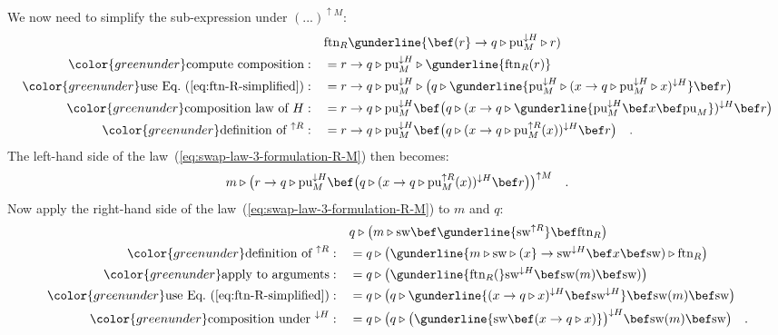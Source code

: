 We now need to simplify the sub-expression under $(...)^{\uparrow M}$:
\begin{align*}
 & \text{ftn}_{R}\gunderline{\bef(r}\rightarrow q\triangleright\text{pu}_{M}^{\downarrow H}\triangleright r)\\
{\color{greenunder}\text{compute composition}:}\quad & =r\rightarrow q\triangleright\text{pu}_{M}^{\downarrow H}\triangleright\gunderline{\text{ftn}_{R}(r)}\\
{\color{greenunder}\text{use Eq.~(\ref{eq:ftn-R-simplified})}:}\quad & =r\rightarrow q\triangleright\text{pu}_{M}^{\downarrow H}\triangleright\big(q\triangleright\gunderline{\text{pu}_{M}^{\downarrow H}\triangleright(x\rightarrow q\triangleright\text{pu}_{M}^{\downarrow H}\triangleright x)^{\downarrow H}}\bef r\big)\\
{\color{greenunder}\text{composition law of }H:}\quad & =r\rightarrow q\triangleright\text{pu}_{M}^{\downarrow H}\bef\big(q\triangleright(x\rightarrow q\triangleright\gunderline{\text{pu}_{M}^{\downarrow H}\bef x\bef\text{pu}_{M}})^{\downarrow H}\bef r\big)\\
{\color{greenunder}\text{definition of }^{\uparrow R}:}\quad & =r\rightarrow q\triangleright\text{pu}_{M}^{\downarrow H}\bef\big(q\triangleright(x\rightarrow q\triangleright\text{pu}_{M}^{\uparrow R}(x))^{\downarrow H}\bef r\big)\quad.
\end{align*}
The left-hand side of the law~(\ref{eq:swap-law-3-formulation-R-M})
then becomes:
\[
m\triangleright\big(r\rightarrow q\triangleright\text{pu}_{M}^{\downarrow H}\bef\big(q\triangleright(x\rightarrow q\triangleright\text{pu}_{M}^{\uparrow R}(x))^{\downarrow H}\bef r\big)\big)^{\uparrow M}\quad.
\]
Now apply the right-hand side of the law~(\ref{eq:swap-law-3-formulation-R-M})
to $m$ and $q$:
\begin{align}
 & q\triangleright\big(m\triangleright\text{sw}\bef\gunderline{\text{sw}^{\uparrow R}}\bef\text{ftn}_{R}\big)\nonumber \\
{\color{greenunder}\text{definition of }^{\uparrow R}:}\quad & =q\triangleright\big(\gunderline{m\triangleright\text{sw}\triangleright(x}\rightarrow\text{sw}^{\downarrow H}\bef x\bef\text{sw})\triangleright\text{ftn}_{R}\big)\nonumber \\
{\color{greenunder}\text{apply to arguments}:}\quad & =q\triangleright\big(\gunderline{\text{ftn}_{R}(}\text{sw}^{\downarrow H}\bef\text{sw}(m)\bef\text{sw})\big)\nonumber \\
{\color{greenunder}\text{use Eq.~(\ref{eq:ftn-R-simplified})}:}\quad & =q\triangleright\big(q\triangleright\gunderline{(x\rightarrow q\triangleright x)^{\downarrow H}\bef\text{sw}^{\downarrow H}}\bef\text{sw}(m)\bef\text{sw}\big)\nonumber \\
{\color{greenunder}\text{composition under }^{\downarrow H}:}\quad & =q\triangleright\big(q\triangleright\big(\gunderline{\text{sw}\bef(x\rightarrow q\triangleright x)}\big)^{\downarrow H}\bef\text{sw}(m)\bef\text{sw}\big)\quad.\label{eq:swap-laws-derivation2}
\end{align}
